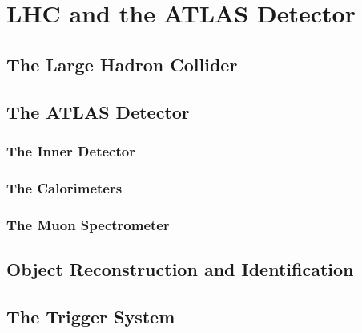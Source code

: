 \chapter[LHC and the ATLAS Detector][LHC and the ATLAS Detector]{LHC and the ATLAS Detector}
\label{ch:detector}


\section{The Large Hadron Collider}\label{sec:detector:lhc}


\section{The ATLAS Detector}\label{sec:detector:atlas}


\subsection{The Inner Detector}\label{sec:detector:id}


\subsection{The Calorimeters}\label{sec:detector:calorimeters}


\subsection{The Muon Spectrometer}\label{sec:detector:muonspec}


\section{Object Reconstruction and Identification}\label{sec:detector:objects}


\section{The Trigger System}\label{sec:detector:trigger}

